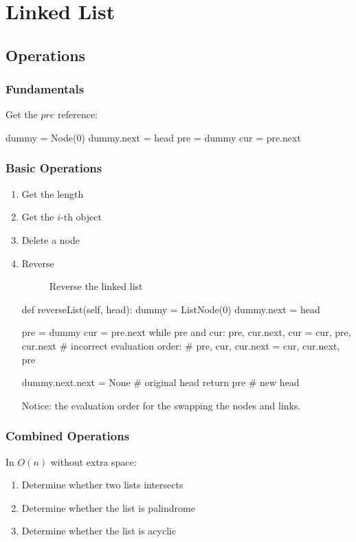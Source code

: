 \chapter{Linked List}


\section{Operations}
\subsection{Fundamentals}
Get the $pre$ reference:
\begin{python}
dummy = Node(0)
dummy.next = head
pre = dummy
cur = pre.next
\end{python}

\subsection{Basic Operations}
\begin{enumerate}
\item Get the length
\item Get the $i$-th object
\item Delete a node 
\item Reverse
\begin{figure}[]
\centering
{}
\caption{Reverse the linked list}
\label{fig:LABEL}
\end{figure}
\begin{python}
def reverseList(self, head):
    dummy = ListNode(0)
    dummy.next = head

    pre = dummy
    cur = pre.next
    while pre and cur:
        pre, cur.next, cur = cur, pre, cur.next
        # incorrect evaluation order:
        # pre, cur, cur.next = cur, cur.next, pre 

    dummy.next.next = None  # original head
    return pre  # new head
\end{python}
Notice: the evaluation order for the swapping the nodes and links. 
\end{enumerate}

\subsection{Combined Operations}
In $O(n)$ without extra space:
\begin{enumerate}
\item Determine whether two lists intersects
\item Determine whether the list is palindrome 
\item Determine whether the list is acyclic
\end{enumerate}

